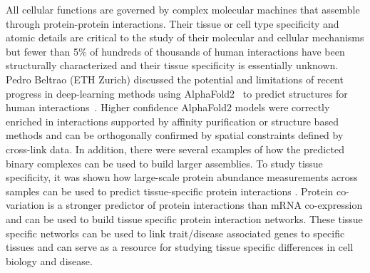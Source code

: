All cellular functions are governed by complex molecular machines that assemble through protein-protein interactions. Their tissue or cell type specificity and atomic details are critical to the study of their molecular and cellular mechanisms but fewer than 5\% of hundreds of thousands of human interactions have been structurally characterized \citep{pmid23399932} and their tissue specificity is essentially unknown. Pedro Beltrao (ETH Zurich) discussed the potential and limitations of recent progress in deep-learning methods using AlphaFold2~\citep{AlphaFold2} to predict structures for human interactions~\citep{pmid36690744}. Higher confidence AlphaFold2 models were correctly enriched in interactions supported by affinity purification or structure based methods and can be orthogonally confirmed by spatial constraints defined by cross-link data. In addition, there were several examples of how the predicted binary complexes can be used to build larger assemblies. To study tissue specificity, it was shown how large-scale protein abundance measurements across samples can be used to predict tissue-specific protein interactions \citep{pmid29032074, pmid28854368}. Protein co-variation is a stronger predictor of protein interactions than mRNA co-expression and can be used to build tissue specific protein interaction networks. These tissue specific networks can be used to link trait/disease associated genes to specific tissues and can serve as a resource for studying tissue specific differences in cell biology and disease.


